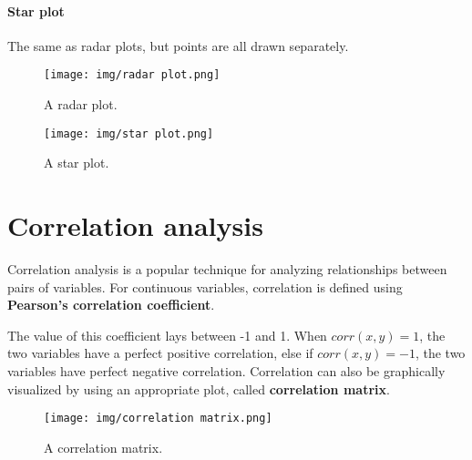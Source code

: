 \paragraph{Star plot}
The same as radar plots, but points are all drawn separately.

\begin{figure}[h]
    \centering
    \begin{minipage}[b]{0.43\textwidth}
        \texttt{[image: img/radar plot.png]}
        \caption{A radar plot.}
    \end{minipage}
    \hfill
    \begin{minipage}[b]{0.43\textwidth}
        \texttt{[image: img/star plot.png]}
        \caption{A star plot.}
    \end{minipage}
\end{figure}

\newpage

\section{Correlation analysis}

Correlation analysis is a popular technique for analyzing relationships between pairs of variables. For continuous variables, correlation is defined using \textbf{Pearson's correlation coefficient}.


The value of this coefficient lays between -1 and 1. When $corr(x,y) = 1$, the two variables have a perfect positive correlation, else if $corr(x,y) = -1$, the two variables have perfect negative correlation. Correlation can also be graphically visualized by using an appropriate plot, called \textbf{correlation matrix}.

\begin{figure}[h]
    \centering
    \texttt{[image: img/correlation matrix.png]}
    \caption{A correlation matrix.}
\end{figure}